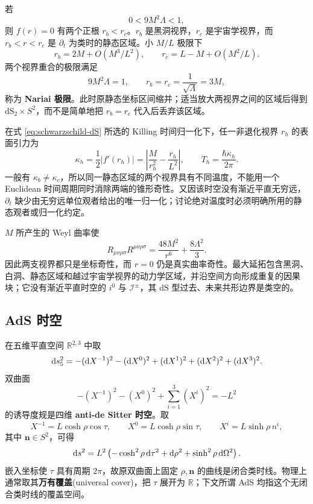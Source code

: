 若
\begin{equation}\label{eq:sdS-horizon-condition}
    0<9M^2\Lambda<1,
\end{equation}
则 $f(r)=0$ 有两个正根 $r_b<r_c$。$r_b$ 是黑洞视界，$r_c$ 是宇宙学视界，而 $r_b<r<r_c$ 是 $\partial_t$ 为类时的静态区域。小 $M/L$ 极限下
\[
    r_b=2M+O(M^3/L^2),\qquad
    r_c=L-M+O(M^2/L).
\]
两个视界重合的极限满足
\[
    9M^2\Lambda=1,\qquad r_b=r_c=\frac1{\sqrt\Lambda}=3M,
\]
称为 \textbf{Nariai 极限}。此时原静态坐标区间缩并；适当放大两视界之间的区域后得到 $\mathrm{dS}_2\times S^2$，而不是简单地把 $r_b=r_c$ 代入后丢弃该区域。

在式 \eqref{eq:schwarzschild-dS} 所选的 Killing 时间归一化下，任一非退化视界 $r_h$ 的表面引力为
\begin{equation}\label{eq:sdS-surface-gravity}
    \kappa_h=\frac12|f'(r_h)|
      =\left|\frac{M}{r_h^2}-\frac{r_h}{L^2}\right|,
    \qquad T_h=\frac{\hbar\kappa_h}{2\pi}.
\end{equation}
一般有 $\kappa_b\ne\kappa_c$，所以同一静态区域的两个视界具有不同温度，不能用一个 Euclidean 时间周期同时消除两端的锥形奇性。又因该时空没有渐近平直无穷远，$\partial_t$ 缺少由无穷远单位观者给出的唯一归一化；讨论绝对温度时必须明确所用的静态观者或归一化约定。

$M$ 所产生的 Weyl 曲率使
\begin{equation}\label{eq:sdS-kretschmann}
    R_{\mu\nu\rho\sigma}R^{\mu\nu\rho\sigma}
      =\frac{48M^2}{r^6}+\frac{8\Lambda^2}{3}.
\end{equation}
因此两支视界都只是坐标奇性，而 $r=0$ 仍是真实曲率奇性。最大延拓包含黑洞、白洞、静态区域和越过宇宙学视界的动力学区域，并沿空间方向形成重复的因果块；它没有渐近平直时空的 $i^0$ 与 $\mathscr I^\pm$，其 dS 型过去、未来共形边界是类空的。

\subsection{AdS 时空}

在五维平直空间 $\mathbb R^{2,3}$ 中取
\[
    \dd s_5^2=-(\dd X^{-1})^2-(\dd X^0)^2
      +(\dd X^1)^2+(\dd X^2)^2+(\dd X^3)^2.
\]
双曲面
\begin{equation}\label{eq:AdS-embedding}
    -(X^{-1})^2-(X^0)^2+\sum_{i=1}^3(X^i)^2=-L^2
\end{equation}
的诱导度规是四维 \textbf{anti-de Sitter 时空}。取
\[
    X^{-1}=L\cosh\rho\cos\tau,\qquad
    X^0=L\cosh\rho\sin\tau,
    \qquad X^i=L\sinh\rho\,n^i,
\]
其中 $\bm n\in S^2$，可得
\begin{equation}\label{eq:AdS-global-rho}
    \dd s^2=L^2\left(-\cosh^2\rho\,\dd\tau^2
      +\dd\rho^2+\sinh^2\rho\,\dd\Omega^2\right).
\end{equation}
嵌入坐标使 $\tau$ 具有周期 $2\pi$，故原双曲面上固定 $\rho,\bm n$ 的曲线是闭合类时线。物理上通常取其\textbf{万有覆盖}(universal cover)，把 $\tau$ 展开为 $\mathbb R$；下文所谓 AdS 均指这个无闭合类时线的覆盖空间。

